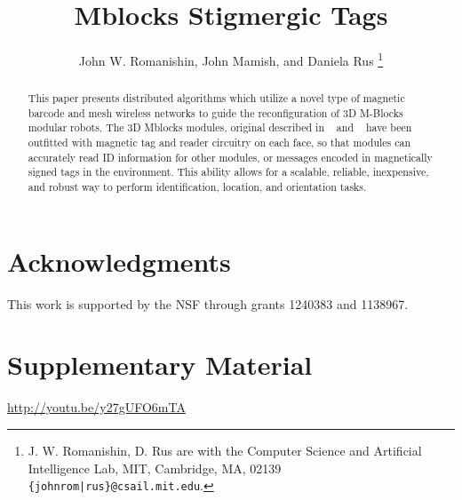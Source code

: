 \documentclass[letterpaper, 10 pt, conference]{ieeeconf}
\title{\LARGE \bf Mblocks Stigmergic Tags}
\author{John W. Romanishin, John Mamish, and Daniela Rus
  \thanks{J. W. Romanishin, D. Rus are with the Computer Science
    and Artificial Intelligence Lab, MIT, Cambridge, MA, 02139
    {\tt\small \{johnrom|rus\}@csail.mit.edu}.}
}
\begin{document}
	
\newcommand{\tagName}{mtag }
\newcommand{\tagNamePlural}{mtags }

\captionsetup[figure]{labelfont=small, textfont=small}
\captionsetup[table]{labelfont=small, textfont=small}

\maketitle

\thispagestyle{empty}
\pagestyle{empty}

\begin{abstract}

This paper presents distributed algorithms which utilize a novel type of magnetic barcode and mesh wireless networks to guide the reconfiguration of 3D M-Blocks modular robots. The 3D Mblocks modules, original described in ~\cite{RomanishinRus-IROS13} and ~\cite{RomanishinRus-IROS13} have been outfitted with magnetic tag and reader circuitry on each face, so that modules can accurately read ID information for other modules, or messages encoded in magnetically signed tags in the environment. This ability allows for a scalable, reliable, inexpensive, and robust way to perform identification, location, and orientation tasks.

\end{abstract}















\section*{Acknowledgments}
This work is supported by the NSF through grants 1240383 and 1138967.
\section*{Supplementary Material}
\url{http://youtu.be/y27gUFO6mTA}




\end{document}
